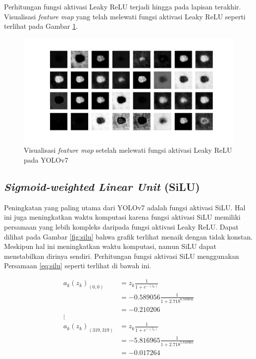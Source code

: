     Perhitungan fungsi aktivasi Leaky ReLU terjadi hingga pada lapisan terakhir. Visualisasi \textit{feature map} yang telah melewati fungsi aktivasi Leaky ReLU seperti terlihat pada Gambar \ref{fig:d-lrelu}.

    \begin{figure}[H]
        \begin{center}
            \includegraphics[width=12cm]{img/bab4/lrelu-layer.png}
            \caption{Visualisasi \textit{feature map} setelah melewati fungsi aktivasi Leaky ReLU pada YOLOv7}
            \label{fig:d-lrelu}
        \end{center}
    \end{figure}

    \subsection{\textit{Sigmoid-weighted Linear Unit} (SiLU)}
    Peningkatan yang paling utama dari YOLOv7 adalah fungsi aktivasi SiLU. Hal ini juga meningkatkan waktu komputasi karena fungsi aktivasi SiLU memiliki persamaan yang lebih kompleks daripada fungsi aktivasi Leaky ReLU. Dapat dilihat pada Gambar \ref{fig:silu} bahwa grafik terlihat menaik dengan tidak konstan. Meskipun hal ini meningkatkan waktu komputasi, namun SiLU dapat menstabilkan dirinya sendiri. Perhitungan fungsi aktivasi SiLU menggunakan Persamaan \ref{eq:silu} seperti terlihat di bawah ini.

    \begin{align*}
        a_k(z_k)_{(0, 0)}       &= z_k\frac{1}{1+e^{-(z_k)}} \\
                                &= -0.589056\frac{1}{1+2.718^{0.589056}} \\
                                &= -0.210206 \\
        \vdots \\
        a_k(z_k)_{(319, 319)}   &= z_k\frac{1}{1+e^{-(z_k)}} \\
                                &= -5.816965\frac{1}{1+2.718^{5.816965}} \\
                                &= -0.017264 \\
    \end{align*}

